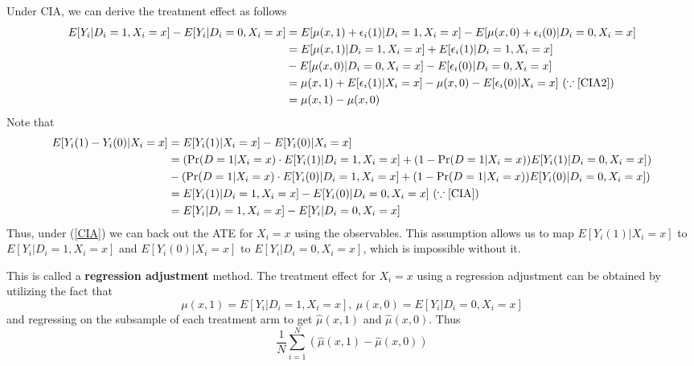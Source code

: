 Under CIA, we can derive the treatment effect as follows
\footnotesize{\begin{align*}
E[Y_i|D_i=1, X_i=x]-E[Y_i|D_i=0, X_i=x]&=E[\mu(x,1)+\epsilon_i(1)|D_i=1, X_i=x]-E[\mu(x,0)+\epsilon_i(0)|D_i=0, X_i=x]\\
&=E[\mu(x,1)|D_i=1, X_i=x]+E[\epsilon_i(1)|D_i=1, X_i=x]\\
&-E[\mu(x,0)|D_i=0, X_i=x]-E[\epsilon_i(0)|D_i=0, X_i=x]\\
&=\mu(x,1)+E[\epsilon_i(1)|X_i=x]-\mu(x,0)-E[\epsilon_i(0)|X_i=x] \ (\because \ref{CIA2})\\
&=\mu(x,1)-\mu(x,0)
\end{align*}}\normalsize
Note that 
\footnotesize{\begin{align*}
E[Y_i(1)-Y_i(0)|X_i=x] &= E[Y_i(1)|X_i=x]- E[Y_i(0)|X_i=x]\\
&=(\Pr(D=1|X_i=x)\cdot E[Y_i(1)|D_i=1,X_i=x]+(1-\Pr(D=1|X_i=x))E[Y_i(1)|D_i=0,X_i=x])\\
&-(\Pr(D=1|X_i=x)\cdot E[Y_i(0)|D_i=1,X_i=x]+(1-\Pr(D=1|X_i=x))E[Y_i(0)|D_i=0,X_i=x])\\
&=  E[Y_i(1)|D_i=1,X_i=x]- E[Y_i(0)|D_i=0,X_i=x] \ (\because \ref{CIA}) \\
&=  E[Y_i|D_i=1, X_i=x]-E[Y_i|D_i=0, X_i=x]
\end{align*}}\normalsize
Thus, under (\ref{CIA}) we can back out the ATE for $X_i=x$ using the observables. This assumption allows us to map $ E[Y_i(1)|X_i=x]$ to $ E[Y_i|D_i=1, X_i=x]$ and $E[Y_i(0)|X_i=x]$ to $ E[Y_i|D_i=0, X_i=x]$, which is impossible without it. \par
This is called a \textbf{regression adjustment} method. The treatment effect for $X_i=x$ using a regression adjustment can be obtained by utilizing the fact that 
\[
\mu(x,1)=E[Y_i|D_i=1, X_i=x], \ \mu(x,0)=E[Y_i|D_i=0, X_i=x]
\]
and regressing on the subsample of each treatment arm to get $\hat{\mu}(x,1)$ and $\hat{\mu}(x,0)$. Thus
\[
\frac{1}{N}\sum_{i=1}^N(\hat{\mu}(x,1)-\hat{\mu}(x,0))
\]

